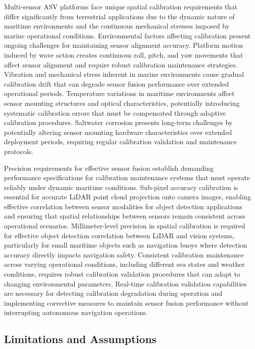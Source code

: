 \documentclass{erauthesis}
\begin{document}
Multi-sensor \ac{ASV} platforms face unique spatial calibration requirements that differ significantly from terrestrial applications due to the dynamic nature of maritime environments and the continuous mechanical stresses imposed by marine operational conditions. Environmental factors affecting calibration present ongoing challenges for maintaining sensor alignment accuracy. Platform motion induced by wave action creates continuous roll, pitch, and yaw movements that affect sensor alignment and require robust calibration maintenance strategies. Vibration and mechanical stress inherent in marine environments cause gradual calibration drift that can degrade sensor fusion performance over extended operational periods. Temperature variations in maritime environments affect sensor mounting structures and optical characteristics, potentially introducing systematic calibration errors that must be compensated through adaptive calibration procedures. Saltwater corrosion presents long-term challenges by potentially altering sensor mounting hardware characteristics over extended deployment periods, requiring regular calibration validation and maintenance protocols.

Precision requirements for effective sensor fusion establish demanding performance specifications for calibration maintenance systems that must operate reliably under dynamic maritime conditions. Sub-pixel accuracy calibration is essential for accurate \ac{LiDAR} point cloud projection onto camera images, enabling effective correlation between sensor modalities for object detection applications and ensuring that spatial relationships between sensors remain consistent across operational scenarios. Millimeter-level precision in spatial calibration is required for effective object detection correlation between \ac{LiDAR} and vision systems, particularly for small maritime objects such as navigation buoys where detection accuracy directly impacts navigation safety. Consistent calibration maintenance across varying operational conditions, including different sea states and weather conditions, requires robust calibration validation procedures that can adapt to changing environmental parameters. Real-time calibration validation capabilities are necessary for detecting calibration degradation during operation and implementing corrective measures to maintain sensor fusion performance without interrupting autonomous navigation operations.

\subsection{Limitations and Assumptions}
\end{document}
